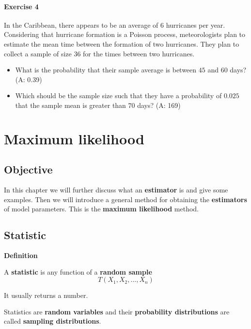 \documentclass[
]{book}
\begin{document}
\hypertarget{exercise-4-3}{%
\subsubsection{Exercise 4}\label{exercise-4-3}}

In the Caribbean, there appears to be an average of \(6\) hurricanes per year. Considering that hurricane formation is a Poisson process, meteorologists plan to estimate the mean time between the formation of two hurricanes. They plan to collect a sample of size \(36\) for the times between two hurricanes.

\begin{itemize}
\item
  What is the probability that their sample average is between \(45\) and \(60\) days? (A: 0.39)
\item
  Which should be the sample size such that they have a probability of \(0.025\) that the sample mean is greater than \(70\) days? (A: 169)
\end{itemize}

\hypertarget{maximum-likelihood}{%
\chapter{Maximum likelihood}\label{maximum-likelihood}}

\hypertarget{objective-7}{%
\section{Objective}\label{objective-7}}

In this chapter we will further discuss what an \textbf{estimator} is and give some examples. Then we will introduce a general method for obtaining the \textbf{estimators} of model parameters. This is the \textbf{maximum likelihood} method.

\hypertarget{statistic}{%
\section{Statistic}\label{statistic}}

\textbf{Definition}

A \textbf{statistic} is any function of a \textbf{random sample}
\[T(X_1,X_2, ..., X_n)\]

It usually returns a number.

Statistics are \textbf{random variables} and their \textbf{probability distributions} are called \textbf{sampling distributions}.
\end{document}
